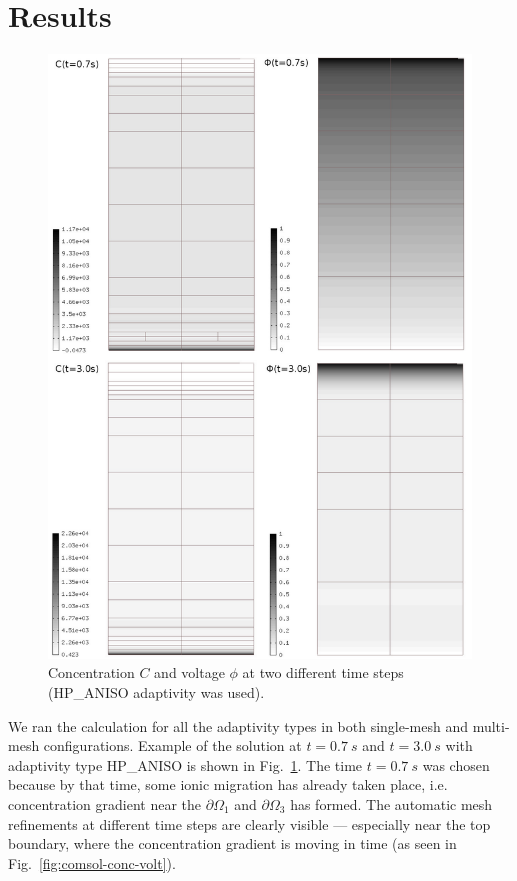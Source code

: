 \section{Results}

\begin{figure}
  \begin{centering}
  \includegraphics[width=.75\columnwidth]{cphi}
  \caption{\label{fig:cphi} Concentration $C$
  and voltage $\phi$ at two different time steps
  (HP\_ANISO adaptivity was used).}
  \end{centering}
\end{figure}

We ran the calculation for all the adaptivity types 
in both single-mesh and multi-mesh configurations. 
Example of the solution at $t=0.7\ s$ and $t=3.0\ s$ 
with adaptivity type HP\_ANISO is shown
in Fig.~\ref{fig:cphi}. The time $t=0.7\ s$ was chosen because
by that time, some ionic migration has already taken place, i.e.
concentration gradient near the $\partial\Omega_1$ and
$\partial\Omega_3$ has formed. The automatic mesh refinements
at different time steps are clearly visible --- especially
near the top boundary, where the concentration gradient is
moving in time (as seen in Fig.~\ref{fig:comsol-conc-volt}).

